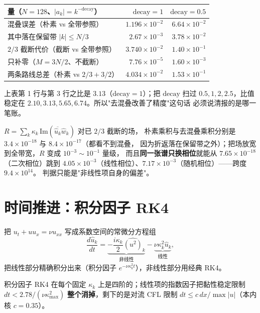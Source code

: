 \begin{center}
\begin{tabular}{@{}lrr@{}}
\toprule
量（$N=128$、$|a_k|=k^{-\mathrm{decay}}$） & $\mathrm{decay}=1$ & $\mathrm{decay}=0.5$ \\
\midrule
混叠误差（朴素 vs 全带参照） & $1.196\times10^{-2}$ & $6.64\times10^{-2}$ \\
其中落在保留带 $|k|\le N/3$ & $2.67\times10^{-3}$ & $3.78\times10^{-2}$ \\
$2/3$ 截断代价（截断 vs 全带参照） & $3.740\times10^{-2}$ & $1.40\times10^{-1}$ \\
只补零（$M=3N/2$、不截断） & $7.76\times10^{-5}$ & $1.60\times10^{-3}$ \\
两条路线总差（朴素 vs $2/3+3/2$） & $4.034\times10^{-2}$ & $1.53\times10^{-1}$ \\
\bottomrule
\end{tabular}
\end{center}

\begin{corollary}[截断的代价大于它消掉的混叠]
上表第 1 行与第 3 行之比是 $3.13$（$\mathrm{decay}=1$）；把 $\mathrm{decay}$ 扫过
$0.5,1,2,2.5$，比值稳定在 $2.10,3.13,5.65,6.74$。所以"去混叠改善了精度"这句话
必须说清报的是哪一笔账。
\end{corollary}

\begin{remark}[能量恒等式残差不是判据]
$R=\sum_k\kappa_k\,\mathrm{Im}(\overline{\hat u_k}\hat w_k)$ 对已 $2/3$ 截断的场，
朴素乘积与去混叠乘积分别是 $3.4\times10^{-18}$ 与 $8.4\times10^{-17}$（都看不到混叠，
因为折返落在保留带之外）；把场放宽到全带宽，$R$ 变成 $10^{-3}\sim10^{-1}$ 量级，
而且\textbf{同一张谱只换相位}就能从 $7.65\times10^{-18}$（二次相位）跳到
$4.05\times10^{-3}$（线性相位）、$7.17\times10^{-3}$（随机相位）——跨度 $9.4\times10^{14}$。
判据只能是"非线性项自身的偏差"。
\end{remark}

\section{时间推进：积分因子 RK4}

把 $u_t+uu_x=\nu u_{xx}$ 写成系数空间的常微分方程组
\[
\frac{d\hat u_k}{dt}=\underbrace{-\frac{i\kappa_k}{2}\widehat{(u^2)}_k}_{\text{非线性}}
-\underbrace{\nu\kappa_k^2\hat u_k}_{\text{线性}},
\]
把线性部分精确积分出来（积分因子 $e^{-\nu\kappa_k^2t}$），非线性部分用经典 RK4。

\begin{theorem}[阶与稳定界]
积分因子 RK4 在每个固定 $\kappa_k$ 上是四阶的；线性项的指数因子把黏性稳定限制
$dt<2.78/(\nu\kappa_{\max}^2)$ \textbf{整个消掉}，剩下的是对流 CFL 限制
$dt\le c\,dx/\max|u|$（本内核 $c=0.35$）。
\end{theorem}

